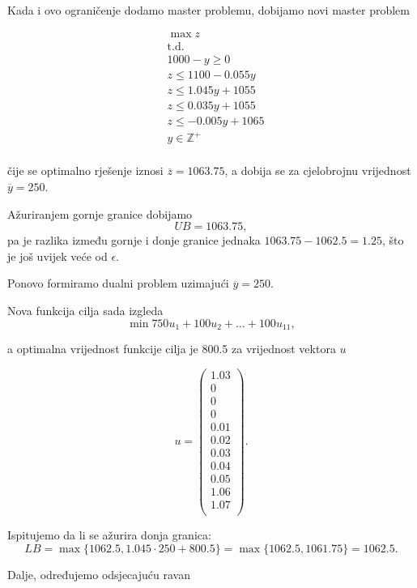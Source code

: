 \documentclass[b5paper, utf8, 11pt, colorlinks]{book}
\theoremstyle{definition}
\begin{document}
 
 Kada i ovo ograničenje dodamo master problemu, dobijamo novi master problem
 
 $$
 \begin{aligned}
 	&\max z\\
 	&\mbox{t.d.}\\
 	&1000-y\geqslant 0\\
 	&z\leqslant 1100-0.055y\\ 
 	&z\leqslant 1.045y+1055\\
 	&z\leqslant 0.035y+1055\\
 	&z\leqslant -0.005y+1065\\
 	&y\in\mathbb{Z}^+\\	
 \end{aligned}
 $$
 

 
 čije se optimalno rješenje iznosi $\overline{z} = 1063.75$, a dobija se za cjelobrojnu vrijednost $\overline{y}=250$.
 
 Ažuriranjem gornje granice dobijamo 
 $$UB = 1063.75,$$ 
 pa je razlika između gornje i donje granice jednaka
 $1063.75-1062.5=1.25$, što je još uvijek veće od $\epsilon$.
 
Ponovo formiramo dualni problem uzimajući $\overline{y}=250$.
 
 Nova funkcija cilja sada izgleda
 $$\min 750u_1+ 100u_2+\ldots+100u_{11},$$
 
 a optimalna vrijednost funkcije cilja je 800.5 za vrijednost vektora $u$
 
 
 $$u=\left(\begin{array}{c}
 	1.03\\
 		0\\
 		0\\
 		0\\
 0.01\\
 0.02\\
 0.03\\
 0.04\\
 0.05\\
 	1.06\\
 	1.07 \\
 \end{array}\right).$$
 
 Ispitujemo da li se ažurira donja granica:
 $$LB = \max\{1062.5, 1.045\cdot 250+ 800.5\} = \max\{1062.5,1061.75\}=1062.5.$$
 
 Dalje, određujemo odsjecajuću ravan
 
\end{document}
